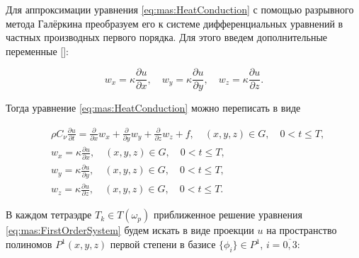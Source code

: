 



Для аппроксимации уравнения \eqref{eq:mas:HeatConduction} с помощью разрывного метода Галёркина преобразуем его к системе дифференциальных уравнений в частных производных первого порядка. Для этого введем дополнительные переменные []: 

$$

w_x=\kappa \frac{\partial u}{\partial x}, \quad 

w_y=\kappa \frac{\partial u}{\partial y}, \quad  

w_z=\kappa \frac{\partial u}{\partial z}.

$$

Тогда уравнение \eqref{eq:mas:HeatConduction} можно переписать в виде

\begin{align}

&\rho C_\nu\frac{\partial u}{\partial t}=\frac{\partial}{\partial x}w_x + \frac{\partial}{\partial y}w_y + \frac{\partial}{\partial z}w_z + f, \quad ( x, y, z ) \in G, \quad 0<t \leq T, \label{eq:mas:FirstOrderSystem} \\

&w_x=\kappa \frac{\partial u}{\partial x}, \quad ( x, y, z ) \in G, \quad 0<t \leq T, \label{eq:mas:FirstOrderSystem:2}\\

&w_y=\kappa \frac{\partial u}{\partial y}, \quad ( x, y, z ) \in G, \quad 0<t \leq T, \label{eq:mas:FirstOrderSystem:4} \\

&w_z=\kappa \frac{\partial u}{\partial z}, \quad ( x, y, z ) \in G, \quad 0<t \leq T. \label{eq:mas:FirstOrderSystem:4}

\end{align}

В каждом тетраэдре $T_k \in T\left( \omega_p\right)$ приближенное решение уравнения \eqref{eq:mas:FirstOrderSystem} будем искать в виде проекции $u$ на пространство полиномов $P^1( x, y, z )$ первой степени в базисе $\{ \phi_i\}\in P^1$, $i=\overline{0, 3}$:

$$

